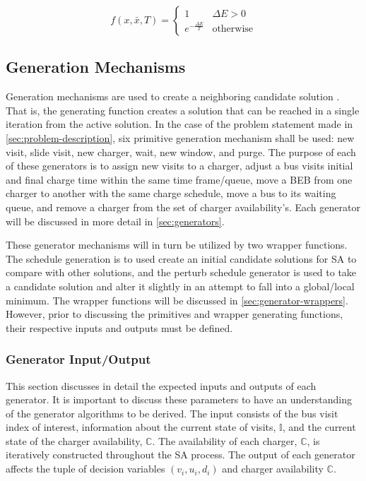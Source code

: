 \documentclass[11pt,a4paper,final]{article}
\newcommand{\I}{\mathbb{I}}                 %
\newcommand{\C}{\mathbb{C}}                 %
\begin{document}
\begin{equation}
\label{eq:candaccept}
f(x,\bar{x},T) =
\begin{cases}
  1                   & \Delta E > 0 \\
  e^{- \frac{\Delta E}{T}} & \text{otherwise}
\end{cases}
\end{equation}

\subsection{Generation Mechanisms}
\label{sec:generation-mechanisms}
Generation mechanisms are used to create a neighboring candidate solution \cite{gendreau-2018-handb-metah}. That is,
the generating function creates a solution that can be reached in a single iteration from the active solution. In the
case of the problem statement made in \ref{sec:problem-description}, six primitive generation mechanism shall be used: new
visit, slide visit, new charger, wait, new window, and purge. The purpose of each of these generators is to assign new
visits to a charger, adjust a bus visits initial and final charge time within the same time frame/queue, move a BEB from
one charger to another with the same charge schedule, move a bus to its waiting queue, and remove a charger from the set
of charger availability's. Each generator will be discussed in more detail in \ref{sec:generators}.

These generator mechanisms will in turn be utilized by two wrapper functions. The schedule generation is to used create
an initial candidate solutions for SA to compare with other solutions, and the perturb schedule generator is used to
take a candidate solution and alter it slightly in an attempt to fall into a global/local minimum. The wrapper functions
will be discussed in \ref{sec:generator-wrappers}. However, prior to discussing the primitives and wrapper generating
functions, their respective inputs and outputs must be defined.

\subsubsection{Generator Input/Output}
\label{sec:generator-input-output}
This section discusses in detail the expected inputs and outputs of each generator. It is important to discuss these
parameters to have an understanding of the generator algorithms to be derived. The input consists of the bus visit index
of interest, information about the current state of visits, \(\I\), and the current state of the charger availability,
\(\C\). The availability of each charger, \(\C\), is iteratively constructed throughout the SA process. The output of each
generator affects the tuple of decision variables \((v_i, u_i, d_i)\) and charger availability \(\C\).
\end{document}
